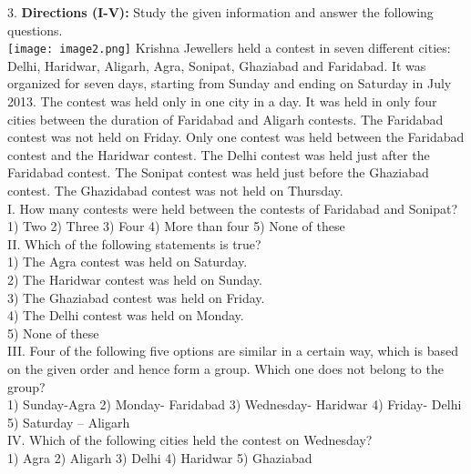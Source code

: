 \documentclass[
]{article}
\begin{document}
3. \textbf{Directions (I-V):} Study the given information and answer the following questions.\\
\texttt{[image: image2.png]}
Krishna Jewellers held a contest in seven different cities: Delhi, Haridwar, Aligarh, Agra,
Sonipat, Ghaziabad and Faridabad. It was organized for seven days, starting from Sunday
and ending on Saturday in July 2013. The contest was held only in one city in a day. It was
held in only four cities between the duration of Faridabad and Aligarh contests. The
Faridabad contest was not held on Friday. Only one contest was held between the
Faridabad contest and the Haridwar contest. The Delhi contest was held just after the
Faridabad contest. The Sonipat contest was held just before the Ghaziabad contest. The
Ghazidabad contest was not held on Thursday.\\

I. How many contests were held between the contests of Faridabad and Sonipat?\\
1) Two \textbf{}2) Three \hspace{2mm}3) Four
\hspace{2mm}4) More than four \hspace{2mm}5) None of these\\

II. Which of the following statements is true?\\
1) The Agra contest was held on Saturday.\\
2) The Haridwar contest was held on Sunday.\\
3) The Ghaziabad contest was held on Friday.\\
4) The Delhi contest was held on Monday.\\
5) None of these\\

III. Four of the following five options are similar in a certain way, which is based on the given
order and hence form a group. Which one does not belong to the group?\\
1) Sunday-Agra \hspace{2mm}2) Monday- Faridabad
\hspace{2mm}3) Wednesday- Haridwar \hspace{2mm}4) Friday- Delhi \hspace{2mm}5) Saturday – Aligarh\\

IV. Which of the following cities held the contest on Wednesday?\\
1) Agra \hspace{2mm}2) Aligarh \hspace{2mm}3) Delhi \hspace{2mm}4) Haridwar \hspace{2mm}5) Ghaziabad\\
\end{document}
